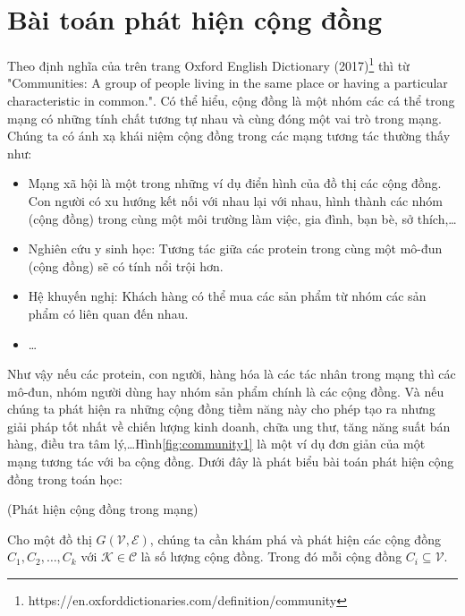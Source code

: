 \section{Bài toán phát hiện cộng đồng}
Theo định nghĩa của trên trang Oxford English Dictionary (2017)\footnote{https://en.oxforddictionaries.com/definition/community} thì từ "Communities: A group of people living in the same place or having a particular characteristic in common.". Có thể hiểu, cộng đồng là một nhóm các cá thể trong mạng có những tính chất tương tự nhau và cùng đóng một vai trò trong mạng. Chúng ta có ánh xạ khái niệm cộng đồng trong các mạng tương tác thường thấy như:
\begin{itemize}
	\item Mạng xã hội là một trong những ví dụ điển hình của đồ thị các cộng đồng. Con người có xu hướng kết nối với nhau lại với nhau, hình thành các nhóm (cộng đồng) trong cùng một môi trường làm việc, gia đình, bạn bè, sở thích,\dots
	\item Nghiên cứu y sinh học: Tương tác giữa các protein trong cùng một mô-đun (cộng đồng) sẽ có tính nổi trội hơn.
	\item Hệ khuyến nghị: Khách hàng có thể mua các sản phẩm từ nhóm các sản phẩm có liên quan đến nhau.
	\item \dots
\end{itemize}
 Như vậy nếu các protein, con người, hàng hóa là các tác nhân trong mạng thì các mô-đun, nhóm người dùng hay nhóm sản phẩm chính là các cộng đồng. Và nếu chúng ta phát hiện ra những cộng đồng tiềm năng này cho phép tạo ra nhưng giải pháp tốt nhất về chiến lượng kinh doanh, chữa ung thư, tăng năng suất bán hàng, điều tra tâm lý,\dots Hình\ref{fig:community1} là một ví dụ đơn giản của một mạng tương tác với ba cộng đồng. Dưới đây là phát biểu bài toán phát hiện cộng đồng trong toán học: 
 \begin{problem}(Phát hiện cộng đồng trong mạng)\label{def:ncdd1}
 	
 	Cho một đồ thị $G(\mathcal{V},\mathcal{E})$, chúng ta cần khám phá và phát hiện các cộng đồng $C_1,C_2,\dots,C_k$ với $\mathcal{K} \in {\mathcal{C}}$ là số lượng cộng đồng. Trong đó mỗi cộng đồng $C_i \subseteq \mathcal{V}$.
 \end{problem}
 
